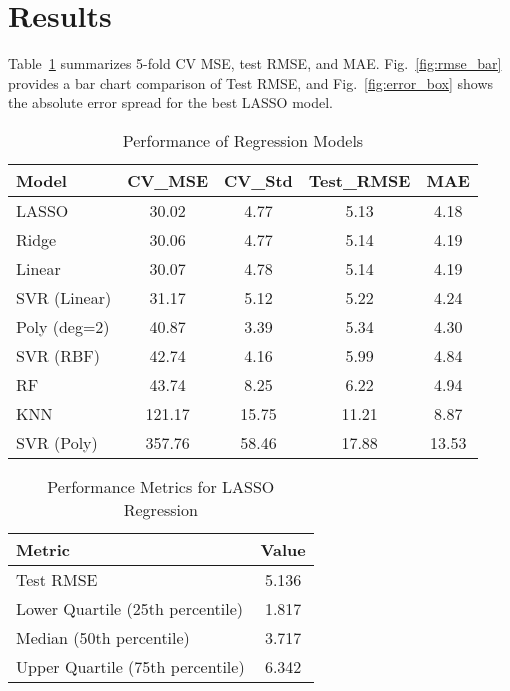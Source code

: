 \documentclass[conference]{IEEEtran}
\begin{document}
\section{Results}
Table~\ref{tab:perf} summarizes 5-fold CV MSE, test RMSE, and MAE.  
Fig.~\ref{fig:rmse_bar} provides a bar chart comparison of Test RMSE, and Fig.~\ref{fig:error_box} shows the absolute error spread for the best LASSO model.

\begin{table}[htbp]\footnotesize
  \caption{Performance of Regression Models}
  \label{tab:perf}
  \centering
  \begin{tabular}{|l|c|c|c|c|}
    \hline
    Model & CV\_MSE & CV\_Std & Test\_RMSE & MAE \\
    \hline
    LASSO                   & 30.02 & 4.77 & 5.13  & 4.18 \\
    Ridge                   & 30.06 & 4.77 & 5.14  & 4.19 \\
    Linear                  & 30.07 & 4.78 & 5.14  & 4.19 \\
    SVR (Linear)            & 31.17 & 5.12 & 5.22  & 4.24 \\
    Poly (deg=2)            & 40.87 & 3.39 & 5.34  & 4.30 \\
    SVR (RBF)               & 42.74 & 4.16 & 5.99  & 4.84 \\
    RF                      & 43.74 & 8.25 & 6.22  & 4.94 \\
    KNN                     &121.17 &15.75 &11.21  & 8.87 \\
    SVR (Poly)              &357.76 &58.46 &17.88  &13.53 \\
    \hline
  \end{tabular}
\end{table}
\begin{table}[htbp]
  \caption{Performance Metrics for LASSO Regression}
  \label{tab:LASSO_metrics}
  \centering
  \begin{tabular}{|l|c|}
    \hline
    \textbf{Metric} & \textbf{Value} \\
    \hline
    Test RMSE                        & 5.136 \\
    Lower Quartile (25th percentile) & 1.817 \\
    Median (50th percentile)         & 3.717 \\
    Upper Quartile (75th percentile) & 6.342 \\
    \hline
  \end{tabular}
\end{table}
\end{document}
